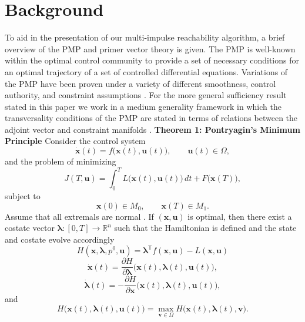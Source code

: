 \documentclass[letterpaper, 10 pt, conference]{ieeeconf}  %
\begin{document}
\section{Background}
To aid in the presentation of our multi-impulse reachability algorithm, a brief overview of the PMP and primer vector theory is given.
The PMP is well-known within the optimal control community to provide a set of necessary conditions for an optimal trajectory of a set of controlled differential equations. Variations of the PMP have been proven under a variety of different smoothness, control authority, and constraint assumptions \cite{BrysonHo69,Bonnans2008}. 
For the more general sufficiency result stated in this paper we work in a medium generality framework in which the transversality conditions of the PMP are stated in terms of relations between the adjoint vector and constraint manifolds \cite{Bonnans2008}. 
\newline
\textbf{Theorem 1: Pontryagin's Minimum Principle} \newline
Consider the control system
\[
    \dot{\mathbf{x}}(t)
    = f\bigl(\mathbf{x}(t),\mathbf{u}(t)\bigr),
    \qquad
    \mathbf{u}(t)\in\Omega,
\]
and the problem of minimizing
\[
    J(T,\mathbf{u})
    =
    \int_0^T
    L\bigl(\mathbf{x}(t),\mathbf{u}(t)\bigr)\,dt
    +
    F\bigl(\mathbf{x}(T)\bigr),
\]
subject to
\[
    \mathbf{x}(0)\in M_0,
    \qquad
    \mathbf{x}(T)\in M_1.
\]
Assume that all extremals are normal \cite{Bonnans2008}. If $(\mathbf{x},\mathbf{u})$ is optimal, then there exist a costate vector
$\boldsymbol{\lambda}\colon[0,T]\to\mathbb{R}^n$ such that the Hamiltonian is defined and the state and costate evolve accordingly
\[
    H(\mathbf{x},\boldsymbol{\lambda},p^0,\mathbf{u})
    =
    \boldsymbol{\lambda}^{\mathsf T}
    f(\mathbf{x},\mathbf{u})
    -
     L(\mathbf{x},\mathbf{u})
\]
\[
    \dot{\mathbf{x}}(t)
    =
    \frac{\partial H}{\partial\boldsymbol{\lambda}}
    \bigl(
        \mathbf{x}(t),
        \boldsymbol{\lambda}(t),
        \mathbf{u}(t)
    \bigr),
\]
\[
    \dot{\boldsymbol{\lambda}}(t)
    =
    -\frac{\partial H}{\partial\mathbf{x}}
    \bigl(
        \mathbf{x}(t),
        \boldsymbol{\lambda}(t),
        \mathbf{u}(t)
    \bigr),
\]
and
\[
    H\bigl(
        \mathbf{x}(t),
        \boldsymbol{\lambda}(t),
        \mathbf{u}(t)
    \bigr)
    =
    \max_{\mathbf{v}\in\Omega}
    H\bigl(
        \mathbf{x}(t),
        \boldsymbol{\lambda}(t),
        \mathbf{v}
    \bigr).
\]
\end{document}
